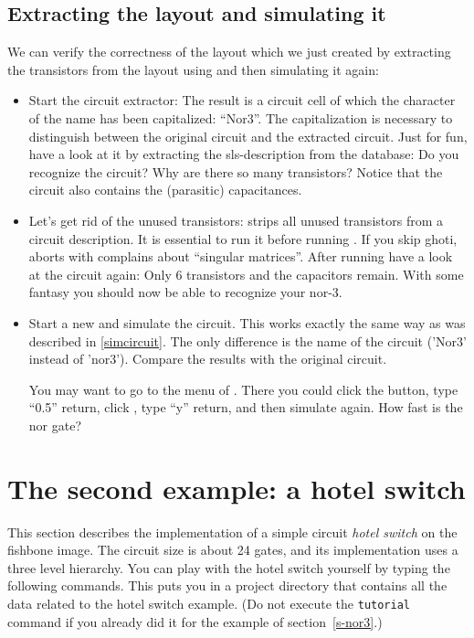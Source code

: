 \subsection{Extracting the layout and simulating it}
We can verify the correctness of the layout which we just created by
extracting the transistors from the layout using  
and then simulating it again:
\begin{itemize}
\item
Start the circuit extractor: 
The result is a circuit cell of which the character of the name has been
capitalized: ``Nor3''. The capitalization is necessary to distinguish
between the original circuit and the extracted circuit.
Just for fun, have a look at it by extracting the sls-description from the
database:
Do you recognize the circuit? Why are there so many transistors? Notice that
the circuit also contains the (parasitic) capacitances.
\item
Let's get rid of the unused transistors:
 strips all unused transistors from a circuit
description. It is essential to run it before running . If you skip
ghoti,  aborts with complains about ``singular matrices''. After
running  have a look at the circuit again: Only 6
transistors and the capacitors remain. With some fantasy you should now be able
to recognize your nor-3.
\item
Start a new  and simulate the circuit. This works
exactly the same way as was described in \ref{simcircuit}. The only difference
is the name of the circuit ('Nor3' instead of 'nor3'). Compare
the results with the original circuit.

You may want to go to the  menu of . 
There you could
click the  
button, type ``0.5'' return, click ,
type ``y'' return, and then simulate again. How fast is the nor gate?
\end{itemize}


\section{The second example: a hotel switch}
\label{s-hotel}
This section describes the implementation of a simple circuit {\sl hotel
switch\/} on the fishbone image. The circuit size is about 24 gates, and its
implementation uses a three level hierarchy. You can play with the hotel switch
yourself by typing the following commands.\cd{}
 
This puts you in a project directory that contains all the data related to the
hotel switch example. (Do not execute the {\tt tutorial} command if you already
did it for the example of section~\ref{s-nor3}.)

